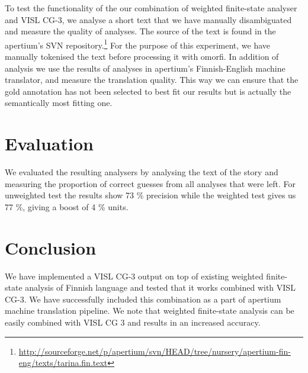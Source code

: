 \documentclass[11pt]{article}
\begin{document}
To test the functionality of the our combination of weighted
finite-state analyser and VISL CG-3, we analyse a short text that we have
manually disambiguated and measure the quality of analyses. The source of the
text is found in the apertium's SVN
repository.\footnote{\url{http://sourceforge.net/p/apertium/svn/HEAD/tree/nursery/apertium-fin-eng/texts/tarina.fin.text}}
For the purpose of this experiment, we have manually tokenised the text
before processing it with omorfi.
In addition of analysis we use the results of analyses in apertium's
Finnish-English machine translator, and measure the translation quality. This
way we can ensure that the gold annotation has not been selected to best fit
our results but is actually the semantically most fitting one.

\section{Evaluation}

We evaluated the resulting analysers by analysing the text of the story and
measuring the proportion of correct guesses from all analyses that were left.
For unweighted test the results show 73 \% precision while the weighted test
gives us 77 \%, giving a boost of 4 \% units.

\section{Conclusion}

We have implemented a VISL CG-3 output on top of existing weighted finite-state
analysis of Finnish language and tested that it works combined with VISL CG-3.
We have successfully included this combination as a part of apertium machine
translation pipeline. We note that weighted finite-state analysis can be
easily combined with VISL CG 3 and results in an increased accuracy.




\end{document}
